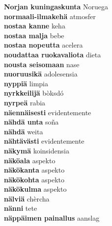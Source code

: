 \textbf{ Norjan  kuningaskunta  } Noruega \\
\textbf{ normaali-ilmakehä  } atmosfer \\
\textbf{ nostaa kanne  } keha \\
\textbf{ nostaa malja  } bebe \\
\textbf{ nostaa nopeutta  } acelera \\
\textbf{ noudattaa ruokavaliota  } dieta \\
\textbf{ nousta seisomaan  } nase \\
\textbf{ nuoruusikä  } adolesensia \\
\textbf{ nyppiä  } limpia \\
\textbf{ nyrkkeilijä  } bòksdó \\
\textbf{ nyrpeä  } rabia \\
\textbf{ näennäisesti  } evidentemente \\
\textbf{ nähdä unta  } soña \\
\textbf{ nähdä  } weita \\
\textbf{ nähtävästi  } evidentemente \\
\textbf{ näkymä  } koinsidensia \\
\textbf{ näköala  } aspekto \\
\textbf{ näkökanta  } aspekto \\
\textbf{ näkökohta  } aspekto \\
\textbf{ näkökulma  } aspekto \\
\textbf{ nälviä  } chèrcha \\
\textbf{ nänni  } tete \\
\textbf{ näppäimen painallus  } aanslag \\
